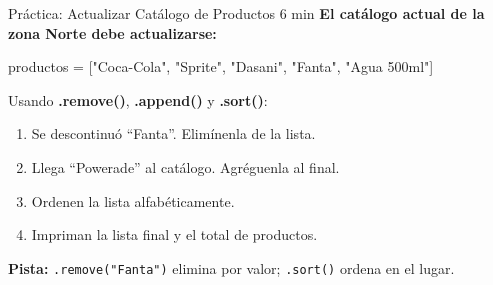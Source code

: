 \documentclass[aspectratio=169, 11pt]{beamer}
\begin{document}
\begin{frame}[fragile,shrink=25]{Práctica: Actualizar Catálogo de Productos \hfill {\normalsize\color{arcaRed}\faClock\hspace{4pt}6 min}}
  \vspace{-6pt}
  {\small\color{arcaDark}\bfseries
    El catálogo actual de la zona Norte debe actualizarse:}

  \vspace{6pt}
  \begin{center}
  {\footnotesize\ttfamily
    productos = ["Coca-Cola", "Sprite", "Dasani", "Fanta", "Agua 500ml"]}
  \end{center}

  \vspace{4pt}
  {\footnotesize\color{textMuted}
    Usando \textbf{.remove()}, \textbf{.append()} y \textbf{.sort()}:}

  \vspace{2pt}
  {\footnotesize
  \begin{enumerate}\setlength{\itemsep}{3pt}
    \item[{\color{arcaRed}\bfseries 1.}]
      Se descontinuó ``Fanta''. Elimínenla de la lista.
    \item[{\color{arcaRed}\bfseries 2.}]
      Llega ``Powerade'' al catálogo. Agréguenla al final.
    \item[{\color{arcaRed}\bfseries 3.}]
      Ordenen la lista alfabéticamente.
    \item[{\color{arcaRed}\bfseries 4.}]
      Impriman la lista final y el total de productos.
  \end{enumerate}
  }

  \vspace{4pt}
  {\scriptsize\color{textMuted}
    \faLightbulb[regular]\hspace{4pt}\textbf{Pista:}
    \texttt{.remove("Fanta")} elimina por valor;
    \texttt{.sort()} ordena en el lugar.}
\end{frame}
\end{document}
